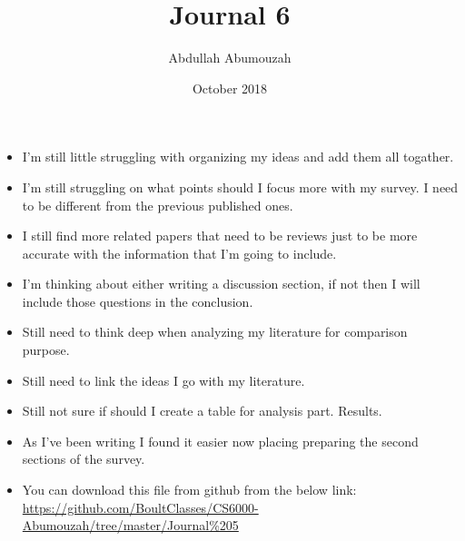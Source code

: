 \documentclass{article}
\title{Journal 6}
\author{Abdullah Abumouzah }
\date{October 2018}
\begin{document}
\maketitle
\begin{itemize}
    \item I'm still little struggling with organizing my ideas and add them all togather.
    \item I'm still struggling on what points should I focus more with my survey. I need to be different from the previous published ones. 
    \item I still find more related papers that need to be reviews just to be more accurate with the information that I'm going to include. 
    \item I'm thinking about either writing a discussion section, if not then I will include those questions in the conclusion.
    \item Still need to think deep when analyzing my literature for comparison purpose.
    \item Still need to link the ideas I go with my literature.
    \item Still not sure if should I create a table for analysis part. Results.
    \item As I've been writing I found it easier now placing preparing the second sections of the survey.
    
    \item You can download this file from github from the below link: \url{https://github.com/BoultClasses/CS6000-Abumouzah/tree/master/Journal%205}
    
    
\end{itemize}
\end{document}
